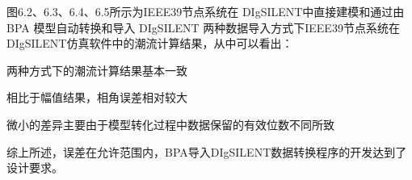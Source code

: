 图6.2、6.3、6.4、6.5所示为IEEE39节点系统在 DIgSILENT中直接建模和通过由 BPA 模型自动转换和导入 DIgSILENT 两种数据导入方式下IEEE39节点系统在DIgSILENT仿真软件中的潮流计算结果，从中可以看出：

\begin{description}[1cm]
\item[-] 两种方式下的潮流计算结果基本一致
\item[-] 相比于幅值结果，相角误差相对较大
\item[-] 微小的差异主要由于模型转化过程中数据保留的有效位数不同所致
\end{description}

综上所述，误差在允许范围内，BPA导入DIgSILENT数据转换程序的开发达到了设计要求。
